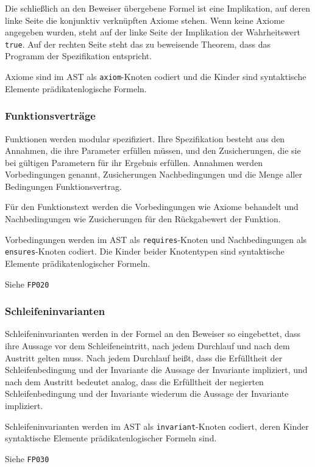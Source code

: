 Die schließlich an den Beweiser übergebene Formel ist eine
Implikation, auf deren linke Seite die konjunktiv verknüpften Axiome
stehen. Wenn keine Axiome angegeben wurden, steht auf der linke Seite
der Implikation der Wahrheitswert \texttt{true}. Auf der rechten Seite
steht das zu beweisende Theorem, dass das Programm der Spezifikation
entspricht.%

Axiome sind im AST als \texttt{axiom}-Knoten codiert und die Kinder
sind syntaktische Elemente prädikatenlogische Formeln.%

\subsubsection{Funktionsverträge}%

Funktionen werden modular spezifiziert. Ihre Spezifikation besteht aus
den Annahmen, die ihre Parameter erfüllen müssen, und den
Zusicherungen, die sie bei gültigen Parametern für ihr Ergebnis
erfüllen. Annahmen werden Vorbedingungen genannt, Zusicherungen
Nachbedingungen und die Menge aller Bedingungen Funktionsvertrag.%

Für den Funktionstext werden die Vorbedingungen wie Axiome behandelt
und Nachbedingungen wie Zusicherungen für den Rückgabewert der
Funktion.%

Vorbedingungen werden im AST als \texttt{requires}-Knoten und
Nachbedingungen als \texttt{ensures}-Knoten codiert. Die Kinder beider
Knotentypen sind syntaktische Elemente prädikatenlogischer Formeln.%

Siehe \texttt{FP020}%

\subsubsection{Schleifeninvarianten}%

Schleifeninvarianten werden in der Formel an den Beweiser so
eingebettet, dass ihre Aussage vor dem Schleifeneintritt, nach jedem
Durchlauf und nach dem Austritt gelten muss. Nach jedem Durchlauf
heißt, dass die Erfülltheit der Schleifenbedingung und der Invariante
die Aussage der Invariante impliziert, und nach dem Austritt bedeutet
analog, dass die Erfülltheit der negierten Schleifenbedingung und der
Invariante wiederum die Aussage der Invariante impliziert.%

Schleifeninvarianten werden im AST als \texttt{invariant}-Knoten
codiert, deren Kinder syntaktische Elemente prädikatenlogischer
Formeln sind.%

Siehe \texttt{FP030}%

